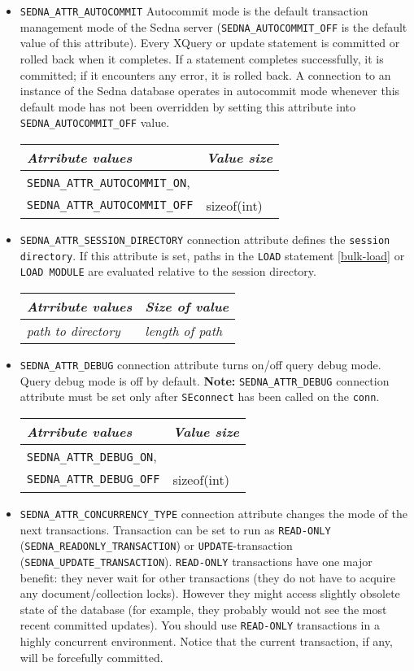 \documentclass[a4paper,12pt]{article}
\begin{document}
\begin{itemize}
\item\verb!SEDNA_ATTR_AUTOCOMMIT! Autocommit mode is the default transaction
management mode of the Sedna server (\verb!SEDNA_AUTOCOMMIT_OFF! is the default
value of this attribute). Every XQuery or update statement is committed or
rolled back when it completes. If a statement completes successfully, it is
committed; if it encounters any error, it is rolled back. A connection to an
instance of the Sedna database operates in autocommit mode whenever this default
mode has not been overridden by setting this attribute into
\verb!SEDNA_AUTOCOMMIT_OFF! value.

\begin{tabular}{|l|l|}
\hline
\emph{Atrribute values} & \emph{Value size} \\
\hline
\verb!SEDNA_ATTR_AUTOCOMMIT_ON!, & \\ 
\verb!SEDNA_ATTR_AUTOCOMMIT_OFF! & sizeof(int) \\
\hline
\end{tabular}

\item\verb!SEDNA_ATTR_SESSION_DIRECTORY! connection attribute defines the
\verb!session directory!. If this attribute is set, paths in the \verb!LOAD!
statement \ref{bulk-load} or \verb!LOAD MODULE! are evaluated relative to the
session directory.

\begin{tabular}{|l|l|}
\hline
\emph{Atrribute values} & \emph{Size of value} \\
\hline
\emph{path to directory} & \emph{length of path} \\
\hline
\end{tabular}

\item\verb!SEDNA_ATTR_DEBUG! connection attribute turns on/off query debug
mode. Query debug mode is off by default. \textbf{Note:} \verb!SEDNA_ATTR_DEBUG!
connection attribute must be set only after \verb!SEconnect! has been called on
the \verb!conn!.

\begin{tabular}{|l|l|}
\hline
\emph{Atrribute values} & \emph{Value size} \\
\hline
\verb!SEDNA_ATTR_DEBUG_ON!, & \\ 
\verb!SEDNA_ATTR_DEBUG_OFF! & sizeof(int) \\
\hline
\end{tabular}

\item\verb!SEDNA_ATTR_CONCURRENCY_TYPE! connection attribute changes the
mode of the next transactions. Transaction can be set to run as \verb!READ-ONLY!
(\verb!SEDNA_READONLY_TRANSACTION!) or \verb!UPDATE!-transaction
(\verb!SEDNA_UPDATE_TRANSACTION!). \verb!READ-ONLY! transactions have one major
benefit: they never wait for other transactions (they do not have to acquire any
document/collection locks). However they might access slightly obsolete state of
the database (for example, they probably would not see the most recent committed
updates). You should use \verb!READ-ONLY! transactions in a highly concurrent
environment. Notice that the current transaction, if any, will be forcefully
committed.


\end{itemize}
\end{document}
